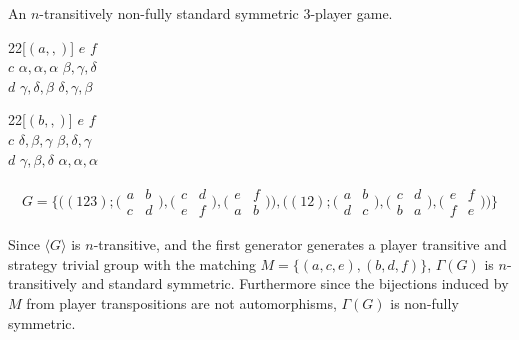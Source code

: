 \begin{example} \label{egntransstandnonfull}	
	An $n$-transitively non-fully standard symmetric $3$-player game.
	\begin{center}
	\begin{game}{2}{2}[$(a,,)$]
			\>  $e$      \>  $f$      \\
		$c$ \>  $\alpha,\alpha,\alpha$  \>  $\beta,\gamma,\delta$  \\
		$d$ \>  $\gamma,\delta,\beta$  \>  $\delta,\gamma,\beta$  
	\end{game}
	\hspace*{5mm}
	\begin{game}{2}{2}[$(b,,)$]
			\>  $e$      \>  $f$      \\
		$c$ \>  $\delta,\beta,\gamma$  \>  $\beta,\delta,\gamma$  \\
		$d$ \>  $\gamma,\beta,\delta$  \>  $\alpha,\alpha,\alpha$  
	\end{game}
	\end{center}
	
	\begin{align*}
		G = \{\bigl((123) ; \bigl(\begin{smallmatrix} a & b \\ c & d \end{smallmatrix}\bigr), \bigl(\begin{smallmatrix} c & d \\ e & f \end{smallmatrix}\bigr), \bigl(\begin{smallmatrix} e & f \\ a & b \end{smallmatrix}\bigr)\bigr), \bigl((12) ; \bigl(\begin{smallmatrix} a & b \\ d & c \end{smallmatrix}\bigr), \bigl(\begin{smallmatrix} c & d \\ b & a \end{smallmatrix}\bigr), \bigl(\begin{smallmatrix} e & f \\ f & e \end{smallmatrix}\bigr)\bigr)\}
	\end{align*}	

    Since $\langle{G}\rangle$ is $n$-transitive, and the first generator generates a player transitive and strategy trivial group with the matching $M  = \{(a,c,e), (b,d,f)\}$, $\Gamma(G)$ is $n$-transitively and standard symmetric. Furthermore since the bijections induced by $M$ from player transpositions are not automorphisms, $\Gamma(G)$ is non-fully symmetric.
\end{example}

